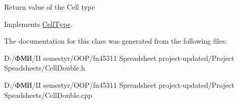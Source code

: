 Return value of the Cell type 

Implements \hyperlink{class_cell_type_a6cbfc477f605049f2a007d8674442230}{Cell\+Type}.



The documentation for this class was generated from the following files\+:\begin{DoxyCompactItemize}
\item 
D\+:/ФМИ/\+I\+I semestyr/\+O\+O\+P/fn45311 Spreadsheet project-\/updated/\+Project Speadsheets/Cell\+Double.\+h\item 
D\+:/ФМИ/\+I\+I semestyr/\+O\+O\+P/fn45311 Spreadsheet project-\/updated/\+Project Speadsheets/Cell\+Double.\+cpp\end{DoxyCompactItemize}
